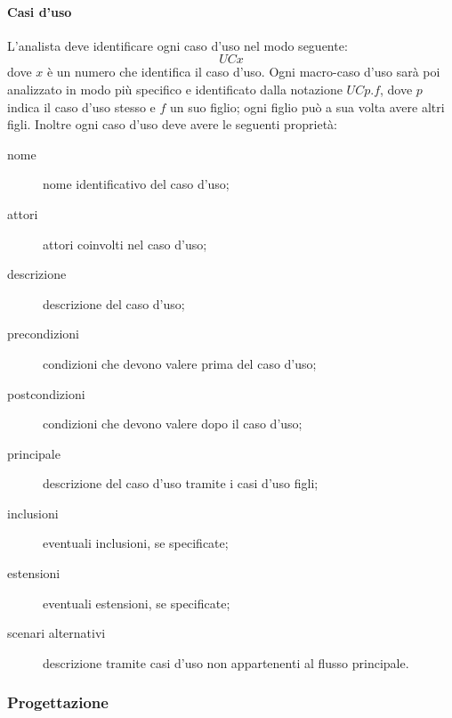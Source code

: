 		\paragraph{Casi d'uso}
		L'analista deve identificare ogni caso d'uso nel modo seguente:
			\[UCx\]
		dove $x$ è un numero che identifica il caso d'uso. Ogni macro-caso d'uso sarà poi analizzato in modo più specifico e identificato dalla notazione $UCp.f$, dove $p$ indica il caso d'uso stesso e $f$ un suo figlio; ogni figlio può a sua volta avere altri figli. Inoltre ogni caso d'uso deve avere le seguenti proprietà:
		\begin{description}
			\item[nome] nome identificativo del caso d'uso;
			\item[attori] attori coinvolti nel caso d'uso;
			\item[descrizione] descrizione del caso d'uso;
			\item[precondizioni] condizioni che devono valere prima del caso d'uso;
			\item[postcondizioni] condizioni che devono valere dopo il caso d'uso;
			\item[ principale] descrizione del caso d'uso tramite i casi d'uso figli;
			\item[inclusioni] eventuali inclusioni, se specificate;
			\item[estensioni] eventuali estensioni, se specificate;
			\item[scenari alternativi] descrizione tramite casi d'uso non appartenenti al flusso principale.
		\end{description}

	\subsubsection{Progettazione} \label{sec:norme_design}
